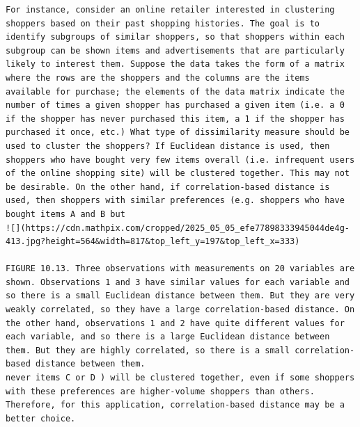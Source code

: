 \documentclass[10pt]{article}
\begin{document}
\begin{verbatim}
For instance, consider an online retailer interested in clustering shoppers based on their past shopping histories. The goal is to identify subgroups of similar shoppers, so that shoppers within each subgroup can be shown items and advertisements that are particularly likely to interest them. Suppose the data takes the form of a matrix where the rows are the shoppers and the columns are the items available for purchase; the elements of the data matrix indicate the number of times a given shopper has purchased a given item (i.e. a 0 if the shopper has never purchased this item, a 1 if the shopper has purchased it once, etc.) What type of dissimilarity measure should be used to cluster the shoppers? If Euclidean distance is used, then shoppers who have bought very few items overall (i.e. infrequent users of the online shopping site) will be clustered together. This may not be desirable. On the other hand, if correlation-based distance is used, then shoppers with similar preferences (e.g. shoppers who have bought items A and B but
![](https://cdn.mathpix.com/cropped/2025_05_05_efe77898333945044de4g-413.jpg?height=564&width=817&top_left_y=197&top_left_x=333)

FIGURE 10.13. Three observations with measurements on 20 variables are shown. Observations 1 and 3 have similar values for each variable and so there is a small Euclidean distance between them. But they are very weakly correlated, so they have a large correlation-based distance. On the other hand, observations 1 and 2 have quite different values for each variable, and so there is a large Euclidean distance between them. But they are highly correlated, so there is a small correlation-based distance between them.
never items C or D ) will be clustered together, even if some shoppers with these preferences are higher-volume shoppers than others. Therefore, for this application, correlation-based distance may be a better choice.


\end{verbatim}
\end{document}
